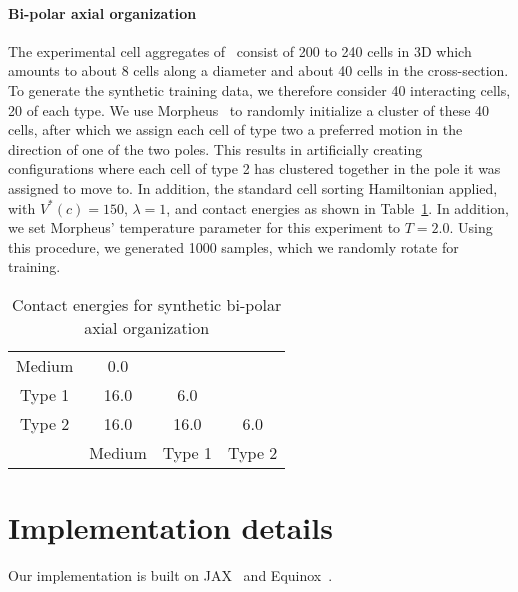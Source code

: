\paragraph{Bi-polar axial organization}


The experimental cell aggregates of~\citet{Toda2018Science} consist of 200 to 240 cells in 3D which amounts to about 8 cells along a diameter and about 40 cells in the cross-section. To generate the synthetic training data, we therefore consider 40 interacting cells, 20 of each type. We use Morpheus~\cite{starruss2014morpheus} to randomly initialize a cluster of these 40 cells, after which we assign each cell of type two a preferred motion in the direction of one of the two poles. This results in artificially creating configurations where each cell of type 2 has clustered together in the pole it was assigned to move to. In addition, the standard cell sorting Hamiltonian applied, with $V^*(c) = 150$, $\lambda=1$, and contact energies as shown in Table~\ref{tbl:contact_energies_toda}. In addition, we set Morpheus' temperature parameter for this experiment to $T=2.0$. Using this procedure, we generated 1000 samples, which we randomly rotate for training.

\begin{table}[h]
\centering
\caption{Contact energies for synthetic bi-polar axial organization}
\label{tbl:contact_energies_toda}

\begin{tabular}{|*{4}{c|}}
    \cline{1-2}
    Medium & 0.0 \\ \cline{1-3}
    Type 1 & 16.0 & 6.0 \\ \hline
    Type 2 & 16.0 & 16.0 & 6.0 \\ \hline
           & Medium & Type 1 & Type 2 \\ \hline
\end{tabular}
\end{table}















\section{Implementation details}\label{sec:appendiximplementation}
Our implementation is built on JAX~\cite{jax2018github} and Equinox~\cite{kidger2021equinox}.

